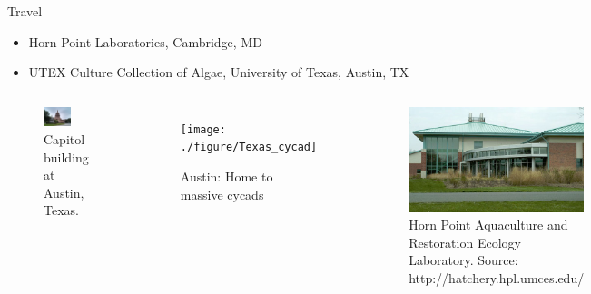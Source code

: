 \documentclass[8pt]{beamer}\usepackage[]{graphicx}\usepackage[]{color}
\begin{document}
\begin{frame}{Travel}
\begin{itemize}
\item Horn Point Laboratories, Cambridge, MD
\item UTEX Culture Collection of Algae, University of Texas, Austin, TX
\end{itemize}
\begin{columns}%
                        \begin{figure}
                                \includegraphics[width=0.6\textwidth]{./figure/UTEX_Austin_TX_capitol}
                                \caption{Capitol building at Austin, Texas.}
                        \end{figure}
                        \begin{figure}
                                \texttt{[image: ./figure/Texas\_cycad]}
                                \caption{Austin: Home to massive cycads}

                        \end{figure}
                        \begin{figure}
                                \includegraphics[width=1\textwidth]{./figure/HornPointLab}
                                \caption{Horn Point Aquaculture and Restoration Ecology Laboratory. Source: http://hatchery.hpl.umces.edu/}
                        \end{figure}
        \end{columns}
\end{frame}
\end{document}
